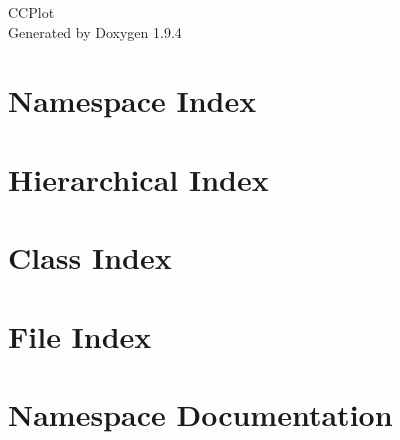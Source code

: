 \documentclass[twoside]{book}
\newcommand{\+}{\discretionary{\mbox{\scriptsize$\hookleftarrow$}}{}{}}
\newcommand{\clearemptydoublepage}{%
    \newpage{\pagestyle{empty}\cleardoublepage}%
  }
\begin{document}
  \raggedbottom
    \hypersetup{pageanchor=false,
                bookmarksnumbered=true,
                pdfencoding=unicode
               }
  \begin{titlepage}
  \vspace*{7cm}
  \begin{center}%
  {\Large CCPlot}\\
  \vspace*{1cm}
  {\large Generated by Doxygen 1.9.4}\\
  \end{center}
  \end{titlepage}
  \clearemptydoublepage
  \tableofcontents
  \clearemptydoublepage
  \hypersetup{pageanchor=true}
\chapter{Namespace Index}

\chapter{Hierarchical Index}

\chapter{Class Index}

\chapter{File Index}

\chapter{Namespace Documentation}


\end{document}
